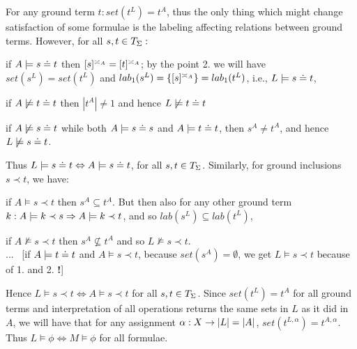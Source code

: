 \documentclass[10pt]{article}
\newcommand{\comt}[1]{... \ \hfill{\small{[#1 {\bf !}]}}}
\begin{document}
\begin{Proof}
For any ground term $t:set(t^L) = t^A$, thus the only thing which
might change satisfaction of some formulae is the labeling affecting
relations between ground terms. However, for all $s,t\in T_{\Sigma}:$
\begin{ite}
\item if $A\models s\mathrel{\dot{=} } t$ then $[s]^{\asymp_{A}}=[t]^{\asymp_{A}}$; by the point
2. we will have $set(s^L)=set(t^L)$ and
$lab_1(s^L)=\{[s]^{\asymp_{A}}\}=lab_1(t^L)$, i.e., $L\models s\mathrel{\dot{=} } t$,
\item if $A\not\models t\mathrel{\dot{=} } t$ then $|t^A|\not=1$ and hence $L\not\models
t\mathrel{\dot{=} } t$
\item if $A\not\models s\mathrel{\dot{=} } t$ while both $A\models s\mathrel{\dot{=} } s$ and
$A\models t\mathrel{\dot{=} } t$, then $s^A\not= t^A$, and hence $L\not\models s\mathrel{\dot{=} } t$.
\end{ite}
Thus $L\models s\mathrel{\dot{=} } t\Leftrightarrow A\models s\mathrel{\dot{=} } t$, for all $s,t\in T_{\Sigma}$.
Similarly, for ground inclusions $s\prec t$, we have:
\begin{ite}
\item if $A\models s\prec t$ then $s^A\subseteq t^A$. But then also for any
other ground term $k:A\models k\prec s \Rightarrow A\models k\prec t$, and so
$lab(s^L)\subseteq lab(t^L)$,
\item if $A\not\models s\prec t$ then $s^A\not\subseteq t^A$ and so
$L\not\models s\prec t$.\\
\comt{if $A\models t\mathrel{\dot{=} } t$ and $A\models s\prec t$, because $set(s^A)=\emptyset$,
we get $L\models s\prec t$ because of 1. and 2.}
\end{ite}
Hence $L\models s\prec t\iff A\models s\prec t$ for all $s,t\in T_{\Sigma}$. Since $set(t^L)=t^A$ for all
ground terms and interpretation of all operations returns the same sets in
$L$ as it did in $A$, we will have that for any assignment $\alpha:X\rightarrow
|L|=|A|$, $set(t^{L,\alpha})=t^{A,\alpha}$. Thus $L\models \phi\iff
M\models\phi$ for all formulae.
\end{Proof}
\end{document}

